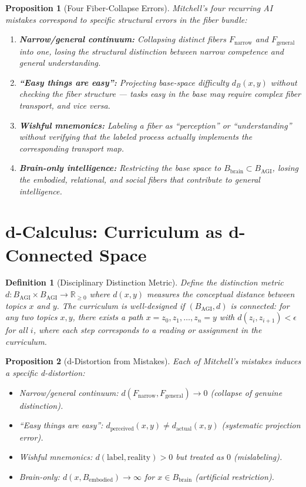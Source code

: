 \documentclass[11pt]{article}
\newtheorem{definition}{Definition}
\newtheorem{proposition}{Proposition}
\begin{document}
\begin{proposition}[Four Fiber-Collapse Errors]
Mitchell's four recurring AI mistakes correspond to specific structural
errors in the fiber bundle:
\begin{enumerate}
  \item \textbf{Narrow/general continuum:} Collapsing distinct fibers
    $F_{\text{narrow}}$ and $F_{\text{general}}$ into one, losing the
    structural distinction between narrow competence and general
    understanding.
  \item \textbf{``Easy things are easy'':} Projecting base-space
    difficulty $d_B(x,y)$ without checking the fiber structure ---
    tasks easy in the base may require complex fiber transport, and
    vice versa.
  \item \textbf{Wishful mnemonics:} Labeling a fiber as ``perception''
    or ``understanding'' without verifying that the labeled process
    actually implements the corresponding transport map.
  \item \textbf{Brain-only intelligence:} Restricting the base space to
    $B_{\text{brain}} \subset B_{\text{AGI}}$, losing the embodied,
    relational, and social fibers that contribute to general
    intelligence.
\end{enumerate}
\end{proposition}

\section{d-Calculus: Curriculum as d-Connected Space}

\begin{definition}[Disciplinary Distinction Metric]
Define the distinction metric $d: B_{\text{AGI}} \times B_{\text{AGI}}
\to \mathbb{R}_{\geq 0}$ where $d(x,y)$ measures the conceptual
distance between topics $x$ and $y$. The curriculum is well-designed
if $(B_{\text{AGI}}, d)$ is connected: for any two topics $x, y$,
there exists a path $x = z_0, z_1, \ldots, z_n = y$ with
$d(z_i, z_{i+1}) < \epsilon$ for all $i$, where each step corresponds
to a reading or assignment in the curriculum.
\end{definition}

\begin{proposition}[d-Distortion from Mistakes]
Each of Mitchell's mistakes induces a specific d-distortion:
\begin{itemize}
  \item Narrow/general continuum: $d(F_{\text{narrow}}, F_{\text{general}})
    \to 0$ (collapse of genuine distinction).
  \item ``Easy things are easy'': $d_{\text{perceived}}(x,y) \neq
    d_{\text{actual}}(x,y)$ (systematic projection error).
  \item Wishful mnemonics: $d(\text{label}, \text{reality}) > 0$ but
    treated as $0$ (mislabeling).
  \item Brain-only: $d(x, B_{\text{embodied}}) \to \infty$ for
    $x \in B_{\text{brain}}$ (artificial restriction).
\end{itemize}
\end{proposition}
\end{document}
